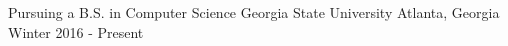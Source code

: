 

\begin{cventries}

  \cventry
    {Pursuing a B.S. in Computer Science} %
    {Georgia State University} %
    {Atlanta, Georgia} %
    {Winter 2016 - Present} %
    {}
\end{cventries}
